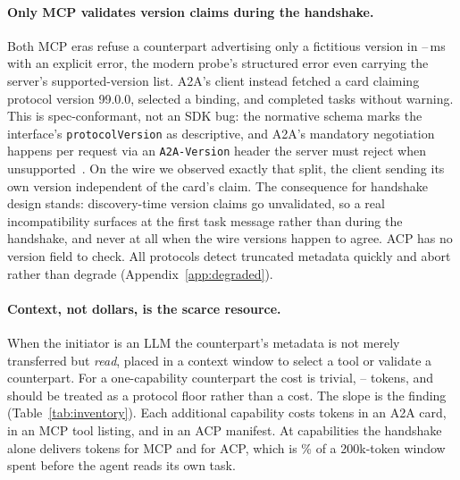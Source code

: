 \documentclass{article}
\newcommand{\code}[1]{\mbox{\texttt{#1}}}
\newcommand{\tabfont}{\footnotesize\setlength{\tabcolsep}{4pt}}
\begin{document}
\paragraph{Only MCP validates version claims during the handshake.}
Both MCP eras refuse a counterpart advertising only a fictitious version in
\SFourCMcpLegacyLocalTtfMed{}--\SFourCMcpModernLocalTtfMed{}\,ms with an
explicit error, the modern probe's structured error even carrying the
server's supported-version list. A2A's client instead fetched a card
claiming protocol version 99.0.0, selected a binding, and completed tasks
without warning. This is spec-conformant, not an SDK bug: the normative
schema marks the interface's \code{protocolVersion} as descriptive, and
A2A's mandatory negotiation happens per request via an \code{A2A-Version}
header the server must reject when unsupported~\citep{a2aspec2026}. On the
wire we observed exactly that split, the client sending its own version
independent of the card's claim. The consequence for handshake design
stands: discovery-time version claims go unvalidated, so a real
incompatibility surfaces at the first task message rather than during the
handshake, and never at all when the wire versions happen to agree. ACP has
no version field to check. All protocols detect truncated metadata quickly
and abort rather than degrade (Appendix~\ref{app:degraded}).

\begin{table}[t]
\centering
\tabfont
\caption{Handshake metadata in tokens as the counterpart's capability
inventory grows, and the marginal cost of one capability. Built by
replicating the captured wire entry $n$ times inside the byte-identical
envelope, so these are the documents an $n$-capability counterpart serves.}
\label{tab:inventory}

\end{table}

\paragraph{Context, not dollars, is the scarce resource.}
When the initiator is an LLM the counterpart's metadata is not merely
transferred but \emph{read}, placed in a context window to select a tool or
validate a counterpart. For a one-capability counterpart the cost is
trivial, \TokAcp{}--\TokMcpModern{} tokens, and should be treated as a
protocol floor rather than a cost. The slope is the finding
(Table~\ref{tab:inventory}). Each additional capability costs
\InvPerCapAtoa{} tokens in an A2A card, \InvPerCapMcp{} in an MCP tool
listing, and \InvPerCapAcp{} in an ACP manifest. At \InvMaxN{} capabilities
the handshake alone delivers \InvMcpNTwoHundred{} tokens for MCP and
\InvAcpNTwoHundred{} for ACP, which is \InvMaxCtxPct{}\% of a 200k-token
window spent before the agent reads its own task.
\end{document}
